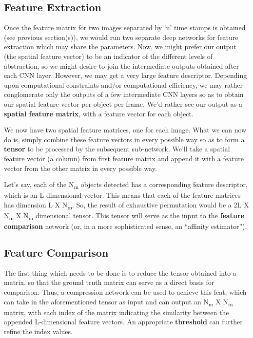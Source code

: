 \documentclass[a4paper]{article}
\begin{document}
    \subsection{Feature Extraction}
    Once the feature matrix for two images separated by ‘n’ time stamps is obtained (see previous section(s)), we would run two separate deep networks for feature extraction which may share the parameters. Now, we might prefer our output (the spatial feature vector) to be an indicator of the different levels of abstraction, so we might desire to join the intermediate outputs obtained after each CNN layer. However, we may get a very large feature descriptor. Depending upon computational constraints and/or computational efficiency, we may rather conglomerate only the outputs of a few intermediate CNN layers so as to obtain our spatial feature vector per object per frame. We’d rather see our output as a \textbf{spatial feature matrix}, with a feature vector for each object.
    
    We now have two spatial feature matrices, one for each image. What we can now do is, simply combine these feature vectors in every possible way so as to form a \textbf{tensor} to be processed by the subsequent sub-network. We’ll take a spatial feature vector (a column) from first feature matrix and append it with a feature vector from the other matrix in every possible way.
    
    Let’s say, each of the N\textsubscript{m} objects detected has a corresponding feature descriptor, which is an L-dimensional vector. This means that each of the feature matrices has dimension L X N\textsubscript{m}. So, the result of exhaustive permutation would be a 2L X N\textsubscript{m} X N\textsubscript{m} dimensional tensor. This tensor will serve as the input to the \textbf{feature comparison} network (or, in a more sophisticated sense, an “affinity estimator”).

    \subsection{Feature Comparison}
    The first thing which needs to be done is to reduce the tensor obtained into a matrix, so that the ground truth matrix can serve as a direct basis for comparison. Thus, a compression network can be used to achieve this feat, which can take in the aforementioned tensor as input and can output an N\textsubscript{m} X N\textsubscript{m} matrix, with each index of the matrix indicating the similarity between the appended L-dimensional feature vectors. An appropriate \textbf{threshold} can further refine the index values.
    
\end{document}
